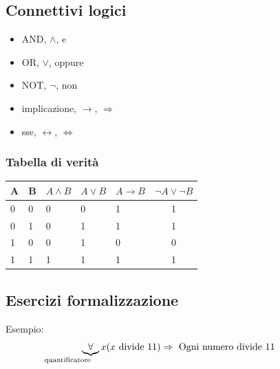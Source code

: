 \documentclass[italian]{article}
\begin{document}
\subsection{Connettivi logici}
\begin{itemize}[itemsep=-5mm]
	\item AND, $\land$, e \\
	\item OR, $\lor$, oppure \\
	\item NOT, $\lnot$, non \\
	\item implicazione, $\rightarrow$, $\Rightarrow$ \\
	\item sse, $\leftrightarrow$, $\Leftrightarrow$ \\
\end{itemize}
\subsubsection{Tabella di verità}
\begin{table}[h]
	\begin{tabular}{|l|l|l|l|l|c|}
		\hline
		A & B & $A\land B$ & $A\lor B$ & $A\to B$ & $\lnot A \lor \lnot B$ \\ \hline
		0 & 0 & 0 & 0 & 1 & 1 \\ \hline
		0 & 1 & 0 & 1 & 1 & 1 \\ \hline
		1 & 0 & 0 & 1 & 0 & 0 \\ \hline
		1 & 1 & 1 & 1 & 1 & 1 \\ \hline
	\end{tabular}
\end{table}
\pagebreak
\subsection{Esercizi formalizzazione}
Esempio:
\[
	\underbrace{\forall}_{\mathllap{\text{quantificatore}}} x (x \text{ divide } 11) \Rightarrow \text{ Ogni numero divide 11}
\]
\end{document}
